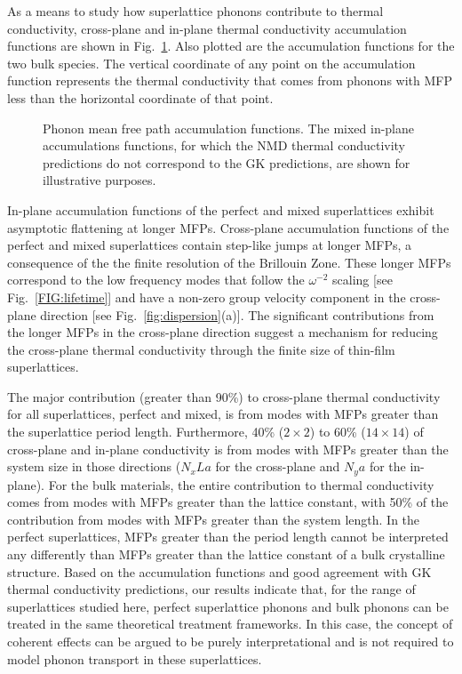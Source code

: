 \documentclass[aps,prb,preprint,preprintnumbers,amsmath,amssymb,floatfix,superscriptaddress]{revtex4}
\begin{document}
As a means to study how superlattice phonons contribute to thermal conductivity, cross-plane and in-plane thermal conductivity accumulation functions are shown in Fig.~\ref{FIG:MFP_cuml}. Also plotted are the accumulation functions for the two bulk species. The vertical coordinate of any point on the accumulation function represents the thermal conductivity that comes from phonons with MFP less than the horizontal coordinate of that point.

\begin{figure}%
\begin{center}
\renewcommand{\figure}{Fig.}
\caption{Phonon mean free path accumulation functions. The mixed in-plane accumulations functions, for which the NMD thermal conductivity predictions do not correspond to the GK predictions, are shown for illustrative purposes.}
\label{FIG:MFP_cuml}
\end{center}
\end{figure}

In-plane accumulation functions of the perfect and mixed superlattices exhibit asymptotic flattening at longer MFPs. Cross-plane accumulation functions of the perfect and mixed superlattices contain step-like jumps at longer MFPs, a consequence of the the finite resolution of the Brillouin Zone.\cite{esfarjani2011heat} These longer MFPs correspond to the low frequency modes that follow the $\omega^{-2}$ scaling [see Fig.~\ref{FIG:lifetime}] and have a non-zero group velocity component in the cross-plane direction [see Fig.~\ref{fig:dispersion}(a)]. The significant contributions from the longer MFPs in the cross-plane direction suggest a mechanism for reducing the cross-plane thermal conductivity through the finite size of thin-film superlattices.\cite{Luckyanova16112012} 

The major contribution (greater than 90\%) to cross-plane thermal conductivity for all superlattices, perfect and mixed, is from modes with MFPs greater than the superlattice period length. Furthermore, 40\% ($2 \times 2 $) to 60\% ($14 \times 14$) of cross-plane and in-plane conductivity is from modes with MFPs greater than the system size in those directions ($N_xLa$ for the cross-plane and $N_ya$ for the in-plane). For the bulk materials, the entire contribution to thermal conductivity comes from modes with MFPs greater than the lattice constant, with 50\% of the contribution from modes with MFPs greater than the system length. In the perfect superlattices, MFPs greater than the period length cannot be interpreted any differently than MFPs greater than the lattice constant of a bulk crystalline structure. Based on the accumulation functions and good agreement with GK thermal conductivity predictions, our results indicate that, for the range of superlattices studied here, perfect superlattice phonons and bulk phonons can be treated in the same theoretical treatment frameworks. In this case, the concept of coherent effects can be argued to be purely interpretational and is not required to model phonon transport in these superlattices. 
\end{document}

